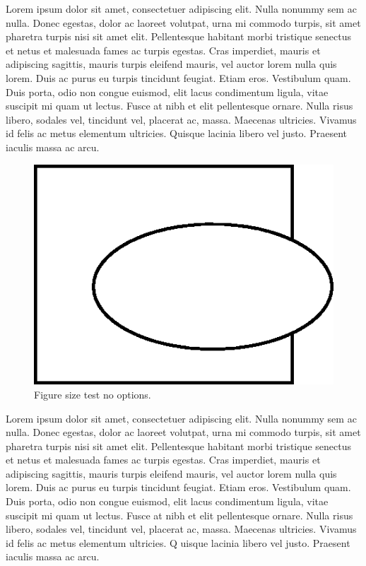 \documentclass{article}
\begin{document}
Lorem ipsum dolor sit amet, consectetuer adipiscing elit. 
Nulla nonummy sem ac nulla. Donec egestas, dolor ac laoreet volutpat, 
urna mi commodo turpis, sit amet pharetra turpis nisi sit amet elit. 
Pellentesque habitant morbi tristique senectus et netus et malesuada 
fames ac turpis egestas. Cras imperdiet, mauris et adipiscing sagittis, 
mauris turpis eleifend mauris, vel auctor lorem nulla quis lorem. 
Duis ac purus eu turpis tincidunt feugiat. Etiam eros. Vestibulum quam. 
Duis porta, odio non congue euismod, elit lacus condimentum ligula, 
vitae suscipit mi quam ut lectus. Fusce at nibh et elit pellentesque ornare. 
Nulla risus libero, sodales vel, tincidunt vel, placerat ac, massa. 
Maecenas ultricies. Vivamus id felis ac metus elementum ultricies. 
Quisque lacinia libero vel justo. Praesent iaculis massa ac arcu.

\begin{figure}
\begin{center}
\includegraphics{fig_oval.png}
\caption{Figure size test no options.} 
\end{center}
\end{figure}

Lorem ipsum dolor sit amet, consectetuer adipiscing elit. 
Nulla nonummy sem ac nulla. Donec egestas, dolor ac laoreet volutpat, 
urna mi commodo turpis, sit amet pharetra turpis nisi sit amet elit. 
Pellentesque habitant morbi tristique senectus et netus et malesuada 
fames ac turpis egestas. Cras imperdiet, mauris et adipiscing sagittis, 
mauris turpis eleifend mauris, vel auctor lorem nulla quis lorem. 
Duis ac purus eu turpis tincidunt feugiat. Etiam eros. Vestibulum quam. 
Duis porta, odio non congue euismod, elit lacus condimentum ligula, 
vitae suscipit mi quam ut lectus. Fusce at nibh et elit pellentesque ornare. 
Nulla risus libero, sodales vel, tincidunt vel, placerat ac, massa. 
Maecenas ultricies. Vivamus id felis ac metus elementum ultricies. Q
uisque lacinia libero vel justo. Praesent iaculis massa ac arcu.
\end{document}
